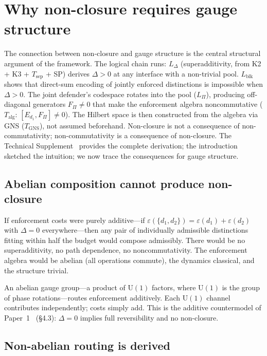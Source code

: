 \documentclass[11pt]{article}
\newcommand{\U}{\mathrm{U}}
\begin{document}
\section{Why non-closure requires gauge structure}
\label{sec:gauge_origin}

The connection between non-closure and gauge structure is the central structural argument of the framework.  The logical chain runs: $L_\Delta$ (superadditivity, from K2 + K3 + $T_{\mathrm{sep}}$ + SP) derives $\Delta > 0$ at any interface with a non-trivial pool.  $L_{\mathrm{blk}}$ shows that direct-sum encoding of jointly enforced distinctions is impossible when $\Delta > 0$.  The joint defender's codespace rotates into the pool ($L_\Pi$), producing off-diagonal generators $F_\Pi \ne 0$ that make the enforcement algebra noncommutative ($T_{\mathrm{alg}}$: $[E_{d_1}, F_\Pi] \ne 0$).  The Hilbert space is then constructed from the algebra via GNS ($T_{\mathrm{GNS}}$), not assumed beforehand.  Non-closure is not a consequence of non-commutativity; non-commutativity is a consequence of non-closure.  The Technical Supplement~\cite{BrookeSupplement} provides the complete derivation; the introduction sketched the intuition; we now trace the consequences for gauge structure.

\subsection{Abelian composition cannot produce non-closure}

If enforcement costs were purely additive---if $\varepsilon(\{d_1, d_2\}) = \varepsilon(d_1) + \varepsilon(d_2)$ with $\Delta = 0$ everywhere---then any pair of individually admissible distinctions fitting within half the budget would compose admissibly.  There would be no superadditivity, no path dependence, no noncommutativity.  The enforcement algebra would be abelian (all operations commute), the dynamics classical, and the structure trivial.

An abelian gauge group---a product of $\U(1)$ factors, where $\U(1)$ is the group of phase rotations---routes enforcement additively.  Each $\U(1)$ channel contributes independently; costs simply add.  This is the additive countermodel of Paper~1~\cite{BrookePaper1} (\S4.3): $\Delta = 0$ implies full reversibility and no non-closure.

\subsection{Non-abelian routing is derived}
\end{document}
